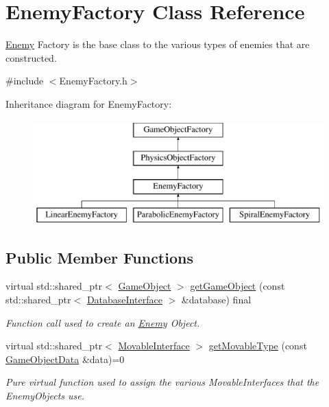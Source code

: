 \hypertarget{class_enemy_factory}{}\section{Enemy\+Factory Class Reference}
\label{class_enemy_factory}


\hyperlink{class_enemy}{Enemy} Factory is the base class to the various types of enemies that are constructed.  




{\ttfamily \#include $<$Enemy\+Factory.\+h$>$}

Inheritance diagram for Enemy\+Factory\+:\begin{figure}[H]
\begin{center}
\leavevmode
\includegraphics[height=4.000000cm]{d8/d4c/class_enemy_factory}
\end{center}
\end{figure}
\subsection*{Public Member Functions}
\begin{DoxyCompactItemize}
\item 
virtual std\+::shared\+\_\+ptr$<$ \hyperlink{class_game_object}{Game\+Object} $>$ \hyperlink{class_enemy_factory_acb6ad18d5ef69a27927907fa9a444c7d}{get\+Game\+Object} (const std\+::shared\+\_\+ptr$<$ \hyperlink{class_database_interface}{Database\+Interface} $>$ \&database) final
\begin{DoxyCompactList}\small\item\em Function call used to create an \hyperlink{class_enemy}{Enemy} Object. \end{DoxyCompactList}\item 
virtual std\+::shared\+\_\+ptr$<$ \hyperlink{class_movable_interface}{Movable\+Interface} $>$ \hyperlink{class_enemy_factory_ae064082d650e676960cb84ebb60ba216}{get\+Movable\+Type} (const \hyperlink{struct_game_object_data}{Game\+Object\+Data} \&data)=0
\begin{DoxyCompactList}\small\item\em Pure virtual function used to assign the various Movable\+Interfaces that the Enemy\+Objects use. \end{DoxyCompactList}\end{DoxyCompactItemize}


